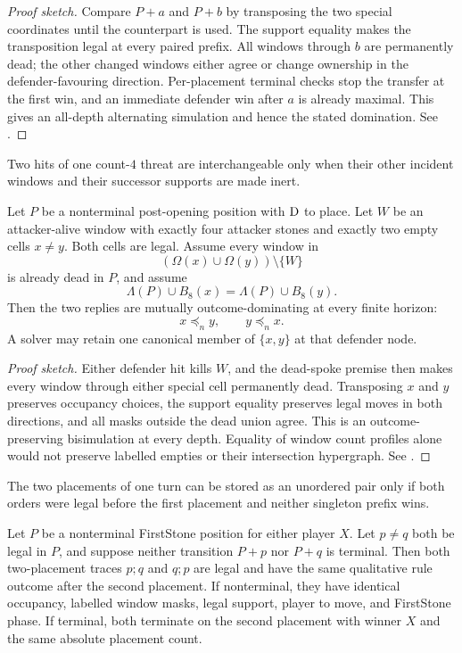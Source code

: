\begin{proof}[Proof sketch]
Compare $P+a$ and $P+b$ by transposing the two special coordinates until the
counterpart is used.  The support equality makes the transposition legal at
every paired prefix.  All windows through $b$ are permanently dead; the other
changed windows either agree or change ownership in the defender-favouring
direction.  Per-placement terminal checks stop the transfer at the first win,
and an immediate defender win after $a$ is already maximal.  This gives an
all-depth alternating simulation and hence the stated domination.  See
\cite{hexobot-companions}.
\end{proof}

Two hits of one count-$4$ threat are interchangeable only when their other
incident windows and their successor supports are made inert.

\begin{proposition}
\label{prop:Dom-P2}
Let $P$ be a nonterminal post-opening position with $\mathrm{D}$ to place.  Let $W$
be an attacker-alive window with exactly four attacker stones and exactly two
empty cells $x\ne y$.  Both cells are legal.  Assume every window in
\[
 (\Omega(x)\cup\Omega(y))\setminus\{W\}
\]
is already dead in $P$, and assume
\[
 \Lambda(P)\cup B_8(x)=\Lambda(P)\cup B_8(y).
\]
Then the two replies are mutually outcome-dominating at every finite horizon:
\[
 x\preceq_n y,
 \qquad y\preceq_n x.
\]
A solver may retain one canonical member of $\{x,y\}$ at that defender node.
\end{proposition}

\begin{proof}[Proof sketch]
Either defender hit kills $W$, and the dead-spoke premise then makes every
window through either special cell permanently dead.  Transposing $x$ and
$y$ preserves occupancy choices, the support equality preserves legal moves
in both directions, and all masks outside the dead union agree.  This is an
outcome-preserving bisimulation at every depth.  Equality of window count
profiles alone would not preserve labelled empties or their intersection
hypergraph.  See \cite{hexobot-companions}.
\end{proof}

The two placements of one turn can be stored as an unordered pair only if
both orders were legal before the first placement and neither singleton prefix
wins.

\begin{proposition}
\label{prop:Dom-P3}
Let $P$ be a nonterminal \textup{FirstStone} position for either player $X$.
Let $p\ne q$ both be legal in $P$, and suppose neither transition $P+p$ nor
$P+q$ is terminal.  Then both two-placement traces $p;q$ and $q;p$ are legal
and have the same qualitative rule outcome after the second placement.  If
nonterminal, they have identical occupancy, labelled window masks, legal
support, player to move, and \textup{FirstStone} phase.  If terminal, both
terminate on the second placement with winner $X$ and the same absolute
placement count.
\end{proposition}

